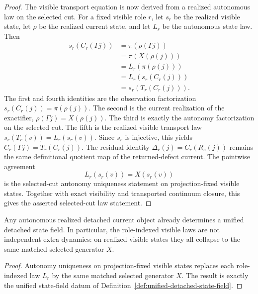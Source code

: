 \begin{proof}
The visible transport equation is now derived from a realized autonomous law
on the selected cut. For a fixed visible role \(r\), let \(s_r\) be the
realized visible state, let \(\rho\) be the realized current state, and let
\(L_r\) be the autonomous state law. Then
\[
\begin{aligned}
s_r(C_r(\Gamma j))
  &= \pi(\rho(\Gamma j)) \\
  &= \pi(X(\rho(j))) \\
  &= L_r(\pi(\rho(j))) \\
  &= L_r(s_r(C_r(j))) \\
  &= s_r(T_r(C_r(j))).
\end{aligned}
\]
The first and fourth identities are the observation factorization
\(s_r(C_r(j))=\pi(\rho(j))\). The second is the current realization of the
exactifier, \(\rho(\Gamma j)=X(\rho(j))\). The third is exactly the autonomy
factorization on the selected cut. The fifth is the realized visible transport
law \(s_r(T_r(v))=L_r(s_r(v))\). Since \(s_r\) is injective, this yields
\(C_r(\Gamma j)=T_r(C_r(j))\). The residual identity
\(\Delta_r(j)=C_r(R_e(j))\) remains the same definitional quotient map of the
returned-defect current. The pointwise agreement
\[
L_r(s_r(v))=X(s_r(v))
\]
is the selected-cut autonomy uniqueness statement on projection-fixed visible
states. Together with exact visibility and transported continuum closure, this
gives the asserted selected-cut law statement.
\end{proof}

\begin{theorem}
\label{thm:autonomy-collapses-to-a-unified-state-field}
Any autonomous realized detached current object already determines a unified
detached state field. In particular, the role-indexed visible laws are not
independent extra dynamics: on realized visible states they all collapse to the
same matched selected generator \(X\).
\end{theorem}

\begin{proof}
Autonomy uniqueness on projection-fixed visible states replaces each
role-indexed law \(L_r\) by the same matched selected generator \(X\). The
result is exactly the unified state-field datum of
Definition~\ref{def:unified-detached-state-field}.
\end{proof}

